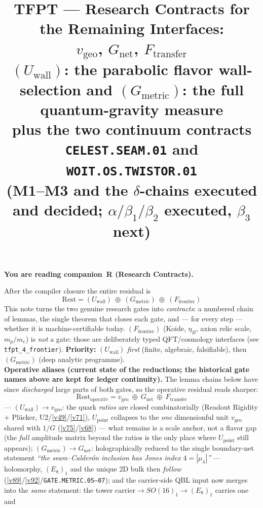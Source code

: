 \documentclass[11pt,a4paper]{article}
\title{\vspace{-1.2cm}\textbf{TFPT --- Research Contracts for the Remaining Interfaces:\\$v_{\mathrm{geo}}$, $G_{\mathrm{net}}$, $F_{\mathrm{transfer}}$}\\[2mm]
\large $(U_{\mathrm{wall}})$: the parabolic flavor wall-selection \quad and\quad
$(G_{\mathrm{metric}})$: the full quantum-gravity measure\\[1mm]
\large plus the two continuum contracts \texttt{CELEST.SEAM.01} and \texttt{WOIT.OS.TWISTOR.01}\\
(M1--M3 and the $\delta$-chains executed and decided; $\alpha/\beta_1/\beta_2$ executed, $\beta_3$ next)}
\author{\TFPTauthors}\date{\TFPTdatestamp}
\begin{document}
\maketitle


\noindent\textbf{You are reading \textbf{companion~R} (Research Contracts).}


\TFPTbadges
\TFPTclaimstack[bridges]

\vspace{-0.6cm}

\begin{keybox}
After the compiler closure the entire residual is
\[
  \boxed{\ \text{Rest}=(U_{\mathrm{wall}})\ \oplus\ (G_{\mathrm{metric}})\ \oplus\ (F_{\mathrm{frontier}})\ }
\]
This note turns the two genuine research gates into \emph{contracts}: a numbered chain of lemmas, the
single theorem that closes each gate, and --- for every step --- whether it is machine-certifiable today.
$(F_{\mathrm{frontier}})$ (Koide, $\eta_B$, axion relic scale, $m_p/m_e$) is \emph{not} a gate: those are
deliberately typed QFT/cosmology interfaces (see \texttt{tfpt\_4\_frontier}). \textbf{Priority:}
$(U_{\mathrm{wall}})$ \emph{first} (finite, algebraic, falsifiable), then $(G_{\mathrm{metric}})$ (deep
analytic programme).
\smallskip\\
\noindent\textbf{Operative aliases (current state of the reductions; the historical gate names above are
kept for ledger continuity).} The lemma chains below have since \emph{discharged} large parts of both
gates, so the operative residual reads sharper:
\[
  \boxed{\ \text{Rest}_{\mathrm{operativ}}=v_{\mathrm{geo}}\ \oplus\ G_{\mathrm{net}}\ \oplus\ F_{\mathrm{transfer}}\ }
\]
--- $(U_{\mathrm{wall}})\to v_{\mathrm{geo}}$: the quark \emph{ratios} are closed combinatorially (Readout
Rigidity $+$ Pl\"ucker, U2/\vref{v49}/\vref{v71}), $U_{\mathrm{point}}$ collapses to the \emph{one} dimensionful unit
$v_{\mathrm{geo}}$ shared with $1/G$ (\vref{v75}/\vref{v68}) --- what remains is a scale anchor, not a flavor gap (the
\emph{full} amplitude matrix beyond the ratios is the only place where $U_{\mathrm{point}}$ still appears);
$(G_{\mathrm{metric}})\to G_{\mathrm{net}}$: holographically reduced to the single boundary-net statement
\emph{``the seam--Calder\'on inclusion has Jones index $4=|\mu_4|$''} --- holomorphy, $(E_8)_1$ and the
unique 2D bulk then \emph{follow} (\vref{v89}/\vref{v92}/\texttt{GATE.METRIC.05--07}); and the carrier-side QBL input
now merges into the \emph{same} statement: the tower carrier${}\to SO(16)_1\to(E_8)_1$ carries one and

\end{keybox}
\end{document}
